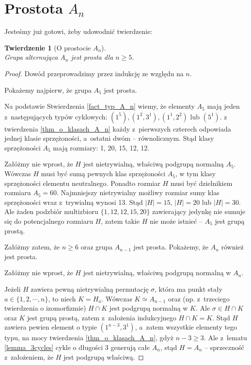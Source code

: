 \documentclass[licencjacka]{pracamgr}
\newtheorem{thh}{Twierdzenie}[section]
\begin{document}
\section{Prostota $A_n$}
Jesteśmy już gotowi, żeby udowodnić twierdzenie:

\begin{thh}[O prostocie $A_n$] $ $ \\
    Grupa alternująca $A_n$ jest prosta dla $n \ge 5$.
\end{thh}
\begin{proof}
    Dowód przeprowadzimy przez indukcję ze względu na $n$.

    Pokażemy najpierw, że grupa $A_5$ jest prosta.

    Na podstawie Stwierdzenia \ref{fact_typ_A_n} wiemy, że elementy $A_5$ mają jeden z~następujących typów cyklowych:
    $(1^5), (1^2, 3^1), (1^1, 2^2)$ lub $(5^1)$.
    z twierdzenia \ref{thm_o_klasach_A_n} każdy z~pierwszych czterech odpowiada jednej klasie sprzężoności, a~ostatni dwóm -- równolicznym.
    Stąd klasy sprzężoności $A_5$ mają rozmiary: 1, 20, 15, 12, 12.

    Załóżmy nie wprost, że $H$ jest nietrywialną, właściwą podgrupą normalną $A_5$.
    Wówczas $H$ musi być sumą pewnych klas sprzężoności $A_5$, w tym klasy sprzężoności elementu neutralnego.
    Ponadto rozmiar $H$ musi być dzielnikiem rozmiaru $A_5 = 60$.
    Najmniejszy nietrywialny możliwy rozmiar sumy klas sprzężoności wraz z~trywialną wynosi 13.
    Stąd $|H| = 15$, $|H| = 20$ lub $|H| = 30$.
    Ale żaden podzbiór multizbioru $\{1, 12, 12, 15, 20 \}$ zawierający jedynkę nie sumuje się do potencjalnego rozmiaru $H$,
    zatem takie $H$ nie może istnieć -- $A_5$ jest grupą prostą.

    Załóżmy zatem, że $n \ge 6$ oraz grupa $A_{n-1}$ jest prosta.
    Pokażemy, że $A_n$ również jest prosta.

    Załóżmy nie wprost, że $H$ jest nietrywialną, właściwą podgrupą normalną w $A_n$.

    Jeżeli $H$ zawiera pewną nietrywialną permutację $\sigma$, która ma punkt stały $a \in \{ 1, 2, \cdots, n \}$, to niech $K = H_a$.
    Wówczas $K \simeq A_{n-1}$ oraz (np. z~trzeciego twierdzenia o izomorfizmie) $H \cap K$ jest podgrupą normalną w $K$.
    Ale $\sigma \in H \cap K$ oraz $K$ jest grupą prostą, zatem z~założenia indukcyjnego $H \cap K = K$.
    Stąd $H$ zawiera pewien element o typie $(1^{n-3}, 3^1)$, a~zatem wszystkie elementy
    tego typu, na mocy twierdzenia \ref{thm_o_klasach_A_n}, gdyż $n-3 \ge 3$.
    Ale z~lematu \ref{lemma_3cycles}    cykle o długości 3 generują całe $A_n$, stąd $H = A_n$ --
    sprzeczność z~założeniem, że $H$ jest podgrupą właściwą.


\end{proof}
\end{document}

